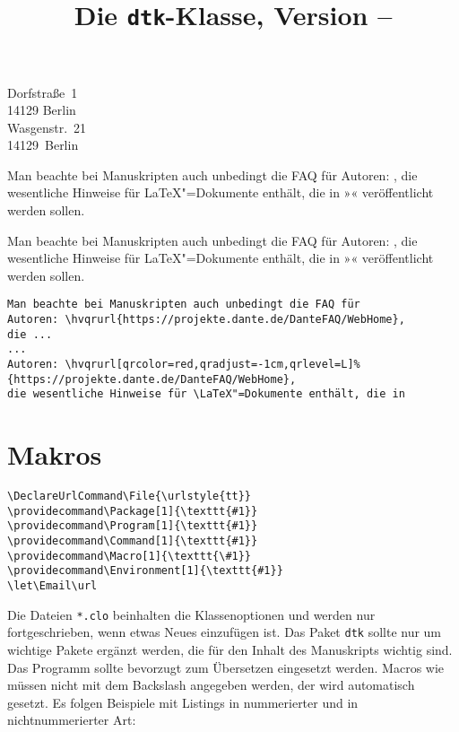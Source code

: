 \documentclass[ngerman]{dtk}
\let\File\texttt
\let\Package\texttt
\begin{document}
\title{Die \texttt{dtk}-Klasse, Version \DTKversion -- \DTKversiondate}
%
    {Dorfstraße~1\\
     14129 Berlin\\
     }
%
    {Wasgenstr.~21\\
     14129~Berlin\\
     }
\maketitle

Man beachte bei Manuskripten auch unbedingt die FAQ für 
Autoren: ,
die wesentliche Hinweise für \LaTeX"=Dokumente enthält, die in 
»\DTK« veröffentlicht werden sollen.
\blindtext

Man beachte bei Manuskripten auch unbedingt die FAQ für 
Autoren: ,
die wesentliche Hinweise für \LaTeX"=Dokumente enthält, die in 
»\DTK« veröffentlicht werden sollen.


\begin{verbatim}
Man beachte bei Manuskripten auch unbedingt die FAQ für 
Autoren: \hvqrurl{https://projekte.dante.de/DanteFAQ/WebHome},
die ...
...
Autoren: \hvqrurl[qrcolor=red,qradjust=-1cm,qrlevel=L]%
{https://projekte.dante.de/DanteFAQ/WebHome},
die wesentliche Hinweise für \LaTeX"=Dokumente enthält, die in 

\end{verbatim}



\section{Makros}

\begin{verbatim}
\DeclareUrlCommand\File{\urlstyle{tt}}
\providecommand\Package[1]{\texttt{#1}}
\providecommand\Program[1]{\texttt{#1}}
\providecommand\Command[1]{\texttt{#1}}
\providecommand\Macro[1]{\texttt{\#1}}
\providecommand\Environment[1]{\texttt{#1}}
\let\Email\url
\end{verbatim}

Die Dateien \File{*.clo} beinhalten die Klassenoptionen und
werden nur fortgeschrieben, wenn etwas Neues einzufügen ist. Das Paket
\Package{dtk} sollte nur um wichtige Pakete ergänzt werden, die für den Inhalt
des Manuskripts wichtig sind. Das Programm  sollte bevorzugt
zum Übersetzen eingesetzt werden. Macros wie  müssen nicht mit
dem Backslash angegeben werden, der wird automatisch gesetzt. Es folgen
Beispiele mit Listings in nummerierter und in nichtnummerierter Art:
\end{document}
